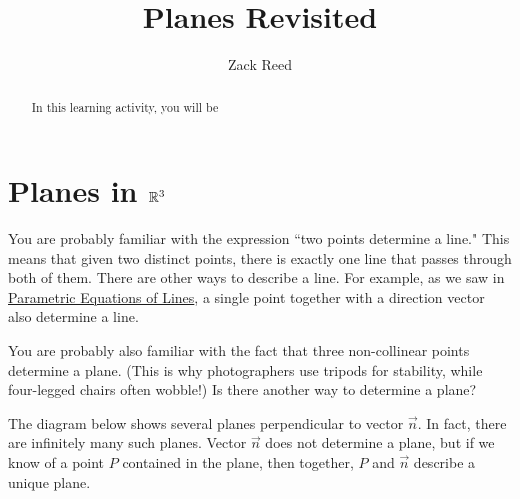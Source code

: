 \documentclass{ximera}
\author{Zack Reed}
\title{Planes Revisited}
\begin{document}
\begin{abstract}

    In this learning activity, you will be 
\end{abstract}
\maketitle

\section*{Planes in $\mathbb{R}^3$}
 
You are probably familiar with the expression ``two points determine a line."  This means that given two distinct points, there is exactly one line that passes through both of them.  There are other ways to describe a line.  For example, as we saw in \href{https://ximera.osu.edu/oerlinalg/LinearAlgebra/RRN-0020/main}{Parametric Equations of Lines}, a single point together with a direction vector also determine a line.
 
You are probably also familiar with the fact that three non-collinear points determine a plane. (This is why photographers use tripods for stability, while four-legged chairs often wobble!)  Is there another way to determine a plane? 
 
The diagram below shows several planes perpendicular to vector $\vec{n}$.  In fact, there are infinitely many such planes.  Vector $\vec{n}$ does not determine a plane, but if we know of a point $P$ contained in the plane, then together, $P$ and $\vec{n}$ describe a unique plane.
 
 \begin{center}
           
     \end{center}
\end{document}
